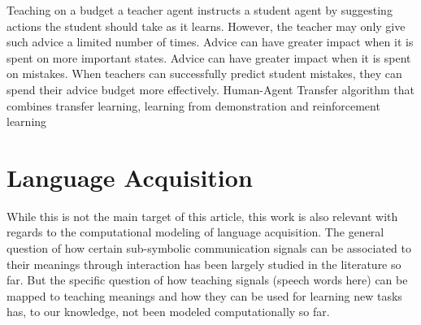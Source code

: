 \cite{torrey2013teaching} Teaching on a budget
a teacher agent instructs a student agent by suggesting actions the student should take as it learns. However, the teacher may only give such advice a limited number of times.  Advice can have greater impact when it is spent on more
important states. Advice can have greater impact when it is spent on mistakes. When teachers can successfully predict student mistakes, they
can spend their advice budget more effectively.
\cite{taylor2011integrating} Human-Agent Transfer algorithm that combines transfer learning, learning from demonstration and reinforcement learning




\section{Language Acquisition}
\label{chapter:related:language}

While this is not the main target of this article, this work is also relevant with regards to the computational modeling of language acquisition. The general question of how certain sub-symbolic communication signals can be associated to their meanings through interaction has been largely studied in the literature so far. But the specific question of how teaching signals (speech words here) can be mapped to teaching meanings and how they can be used for learning new tasks has, to our knowledge, not been modeled computationally so far. 

